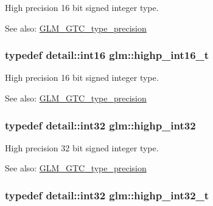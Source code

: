 High precision 16 bit signed integer type. \begin{Desc}
\item[See also:]\hyperlink{group__gtc__type__precision}{GLM\_\-GTC\_\-type\_\-precision} \end{Desc}
\hypertarget{group__gtc__type__precision_g07d318d61472e75238e53b9642227672}{
\subsubsection[highp\_\-int16\_\-t]{\setlength{\rightskip}{0pt plus 5cm}typedef detail::int16 {\bf glm::highp\_\-int16\_\-t}}}
\label{group__gtc__type__precision_g07d318d61472e75238e53b9642227672}


High precision 16 bit signed integer type. \begin{Desc}
\item[See also:]\hyperlink{group__gtc__type__precision}{GLM\_\-GTC\_\-type\_\-precision} \end{Desc}
\hypertarget{group__gtc__type__precision_ga2045c92b9553d463191af6a20e997bb}{
\subsubsection[highp\_\-int32]{\setlength{\rightskip}{0pt plus 5cm}typedef detail::int32 {\bf glm::highp\_\-int32}}}
\label{group__gtc__type__precision_ga2045c92b9553d463191af6a20e997bb}


High precision 32 bit signed integer type. \begin{Desc}
\item[See also:]\hyperlink{group__gtc__type__precision}{GLM\_\-GTC\_\-type\_\-precision} \end{Desc}
\hypertarget{group__gtc__type__precision_g783d077a513c1f475f6cdb406b4238c3}{
\subsubsection[highp\_\-int32\_\-t]{\setlength{\rightskip}{0pt plus 5cm}typedef detail::int32 {\bf glm::highp\_\-int32\_\-t}}}
\label{group__gtc__type__precision_g783d077a513c1f475f6cdb406b4238c3}


